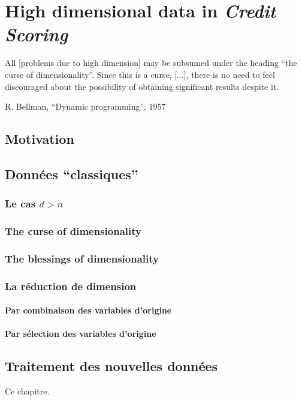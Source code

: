 \chapter{High dimensional data in \textit{Credit Scoring}} \label{chap7}

\minitoc

\epigraph{All [problems due to high dimension] may be subsumed under the
heading “the curse of dimensionality”. Since this is a curse, [...], there is
no need to feel discouraged about the possibility of obtaining significant
results despite it.}{R. Bellman, ``Dynamic programming'', 1957}


\section{Motivation}



\section{Données ``classiques''}

\subsection{Le cas $d > n$}


\subsection{The curse of dimensionality}


\subsection{The blessings of dimensionality}


\subsection{La réduction de dimension}


\subsubsection{Par combinaison des variables d'origine}

\subsubsection{Par sélection des variables d'origine}


\section{Traitement des nouvelles données}

\bigskip

Ce chapitre.


\printbibliography[heading=subbibliography, title=Références du chapitre 6]